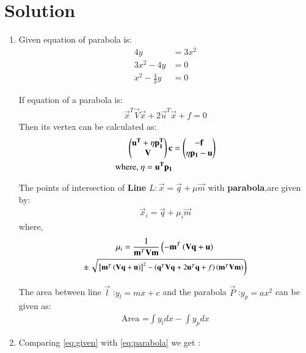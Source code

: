 \documentclass[journal,12pt,twocolumn]{IEEEtran}
\begin{document}
\section{Solution}
\begin{enumerate}
\item Given equation of parabola is:
\begin{align}
 4y&=3x^2
 \\
 3x^2-4y&=0
 \\
 x^2-\frac{4}{3}y&=0 \label{eq:given}
\end{align}
\begin{lemma}
If equation of a parabola is:
\begin{align}
\vec{x}^T\vec{V}\vec{x}+2\vec{u}^T\vec{x}+f=0 \label{eq:parabola}
\end{align}
Then its vertex can be calculated as:
\begin{align} \begin{pmatrix}\mathbf{u^T}+\eta\mathbf{p_1^T}\\\mathbf{V} \end{pmatrix}\mathbf{c} &= \begin{pmatrix}\mathbf{-f}\\\eta \mathbf{p_1} -\mathbf{u}\end{pmatrix} \label{eq:vertex}
\\
\text{where, }  \eta = \mathbf{u^T}\mathbf{p_1}
\end{align}
\end{lemma}
\begin{lemma}
The points of intersection of \textbf{Line} $L:\vec{x}=\vec{q}+\mu\vec{m}$ with \textbf{parabola},are given by:
\begin{align}
\vec{x}_i = \vec{q}+\mu_i\vec{m}
\end{align}
%
where,
\begin{multline}
\mu_i = \frac{1}
{
\mathbf{m}^T\mathbf{V}\mathbf{m}
}
\left(-\mathbf{m}^T\left(\mathbf{V}\mathbf{q}+\mathbf{u}\right)\right.
\\
\pm
{\small
\ensuremath{\left.\sqrt{
{}\left[
\mathbf{m}^T\left(\mathbf{V}\mathbf{q}+\mathbf{u}\right)
\right]^2
-
\left(
\mathbf{q}^T\mathbf{V}\mathbf{q} + 2\mathbf{u}^T\mathbf{q} +f
\right)
\left(\mathbf{m}^T\mathbf{V}\mathbf{m}\right)
}
\right)}
}\label{eq:mu_i}
\end{multline}
\end{lemma}
\begin{lemma}
\label{lemma3}
The area between line $\vec{l}$ :$y_l=mx+c$ and the parabola $\vec{P}$ :$y_p=ax^2$ can be given as:
\begin{align}
\text{Area =} \int y_l dx-\int y_p dx
\end{align}
\end{lemma}
\item Comparing \eqref{eq:given} with \eqref{eq:parabola} we get :
\begin{align}

\end{align}
\end{enumerate}
\end{document}
